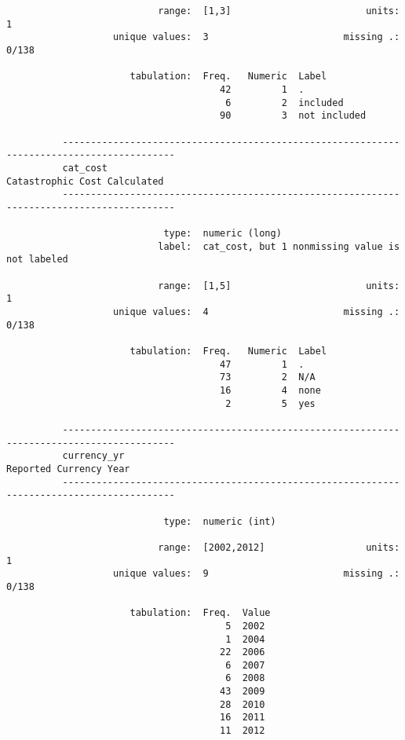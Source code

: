 \documentclass{article}
\begin{document}
\begin{verbatim}
                           range:  [1,3]                        units:  1
                   unique values:  3                        missing .:  0/138
          
                      tabulation:  Freq.   Numeric  Label
                                      42         1  .
                                       6         2  included
                                      90         3  not included
          
          ------------------------------------------------------------------------------------------
          cat_cost                                                      Catastrophic Cost Calculated
          ------------------------------------------------------------------------------------------
          
                            type:  numeric (long)
                           label:  cat_cost, but 1 nonmissing value is not labeled
          
                           range:  [1,5]                        units:  1
                   unique values:  4                        missing .:  0/138
          
                      tabulation:  Freq.   Numeric  Label
                                      47         1  .
                                      73         2  N/A
                                      16         4  none
                                       2         5  yes
          
          ------------------------------------------------------------------------------------------
          currency_yr                                                         Reported Currency Year
          ------------------------------------------------------------------------------------------
          
                            type:  numeric (int)
          
                           range:  [2002,2012]                  units:  1
                   unique values:  9                        missing .:  0/138
          
                      tabulation:  Freq.  Value
                                       5  2002
                                       1  2004
                                      22  2006
                                       6  2007
                                       6  2008
                                      43  2009
                                      28  2010
                                      16  2011
                                      11  2012
          

\end{verbatim}
\end{document}
